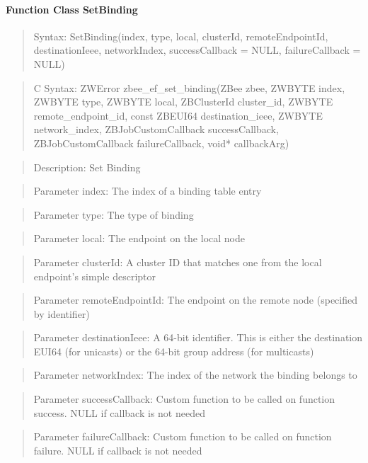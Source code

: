 \paragraph{Function Class SetBinding}
\begin{quote}Syntax: SetBinding(index, type, local, clusterId, remoteEndpointId, destinationIeee, networkIndex, successCallback = NULL, failureCallback = NULL)\end{quote}
\begin{quote}C Syntax: ZWError zbee\_ef\_set\_binding(ZBee zbee, ZWBYTE index, ZWBYTE type, ZWBYTE local, ZBClusterId cluster\_id, ZWBYTE remote\_endpoint\_id, const ZBEUI64 destination\_ieee, ZWBYTE network\_index, ZBJobCustomCallback successCallback, ZBJobCustomCallback failureCallback, void* callbackArg)\end{quote}
\begin{quote}Description: Set Binding\end{quote}
\begin{quote}Parameter index: The index of a binding table entry\end{quote}
\begin{quote}Parameter type: The type of binding\end{quote}
\begin{quote}Parameter local: The endpoint on the local node\end{quote}
\begin{quote}Parameter clusterId: A cluster ID that matches one from the local endpoint's simple descriptor\end{quote}
\begin{quote}Parameter remoteEndpointId: The endpoint on the remote node (specified by identifier)\end{quote}
\begin{quote}Parameter destinationIeee: A 64-bit identifier. This is either the destination EUI64 (for unicasts) or the 64-bit group address (for multicasts)\end{quote}
\begin{quote}Parameter networkIndex: The index of the network the binding belongs to\end{quote}
\begin{quote}Parameter successCallback: Custom function to be called on function success. NULL if callback is not needed\end{quote}
\begin{quote}Parameter failureCallback: Custom function to be called on function failure. NULL if callback is not needed\end{quote}


